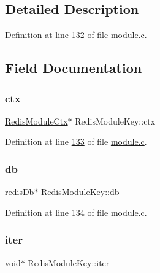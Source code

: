 \subsection{Detailed Description}


Definition at line \hyperlink{module_8c_source_l00132}{132} of file \hyperlink{module_8c_source}{module.\+c}.



\subsection{Field Documentation}
\mbox{\label{structRedisModuleKey_aa29497b69db42b94f633a644516d9c5a}} 
\subsubsection{\texorpdfstring{ctx}{ctx}}
{\footnotesize\ttfamily \hyperlink{structRedisModuleCtx}{Redis\+Module\+Ctx}$\ast$ Redis\+Module\+Key\+::ctx}



Definition at line \hyperlink{module_8c_source_l00133}{133} of file \hyperlink{module_8c_source}{module.\+c}.

\mbox{\label{structRedisModuleKey_a30f9a4d4078167bb2f35ca87377be25b}} 
\subsubsection{\texorpdfstring{db}{db}}
{\footnotesize\ttfamily \hyperlink{structredisDb}{redis\+Db}$\ast$ Redis\+Module\+Key\+::db}



Definition at line \hyperlink{module_8c_source_l00134}{134} of file \hyperlink{module_8c_source}{module.\+c}.

\mbox{\label{structRedisModuleKey_ad3e45fd972de43ed1219470eed8baa1d}} 
\subsubsection{\texorpdfstring{iter}{iter}}
{\footnotesize\ttfamily void$\ast$ Redis\+Module\+Key\+::iter}



